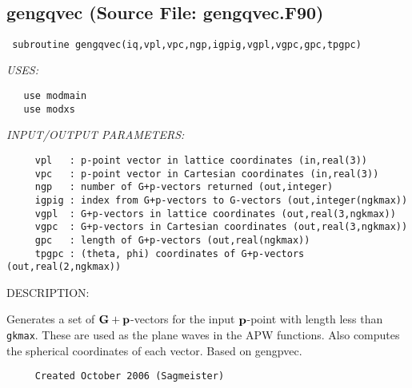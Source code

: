 \documentclass[11pt]{article}
\begin{document}

 
 
\mbox{}\hrulefill\ 
 
\subsection{gengqvec (Source File: gengqvec.F90)}


\begin{verbatim} subroutine gengqvec(iq,vpl,vpc,ngp,igpig,vgpl,vgpc,gpc,tpgpc)\end{verbatim}{\em USES:}
\begin{verbatim}   use modmain
   use modxs\end{verbatim}{\em INPUT/OUTPUT PARAMETERS:}
\begin{verbatim}     vpl   : p-point vector in lattice coordinates (in,real(3))
     vpc   : p-point vector in Cartesian coordinates (in,real(3))
     ngp   : number of G+p-vectors returned (out,integer)
     igpig : index from G+p-vectors to G-vectors (out,integer(ngkmax))
     vgpl  : G+p-vectors in lattice coordinates (out,real(3,ngkmax))
     vgpc  : G+p-vectors in Cartesian coordinates (out,real(3,ngkmax))
     gpc   : length of G+p-vectors (out,real(ngkmax))
     tpgpc : (theta, phi) coordinates of G+p-vectors (out,real(2,ngkmax))\end{verbatim}
{\sf DESCRIPTION:\\ }


     Generates a set of ${\bf G+p}$-vectors for the input ${\bf p}$-point with
     length less than {\tt gkmax}. These are used as the plane waves in the APW
     functions. Also computes the spherical coordinates of each vector.
     Based on gengpvec.
  
\begin{verbatim}     Created October 2006 (Sagmeister)\end{verbatim}







\end{document}

